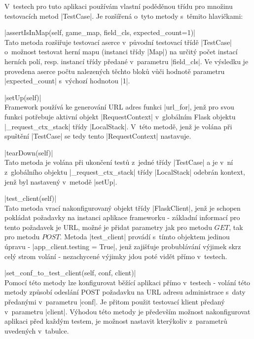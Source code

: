 V~testech pro tuto aplikaci používám vlastní poděděnou třídu pro množinu testovacích metod \ic|TestCase|. Je rozšířená o~tyto metody s~těmito hlavičkami:
\begin{description}
	\item \ic|assertIsInMap(self, game_map, field_cls, expected_count=1)| \\
	Tato metoda rozšiřuje testovací aserce v~původní testovací třídě \ic|TestCase| o~možnost testovat herní mapu (instanci třídy \ic|Map|) na určitý počet instací herních polí, resp. instancí třídy předané v~parametru \ic|field_cls|. Ve výsledku je provedena aserce počtu nalezených těchto bloků vůči hodnotě parametru \ic|expected_count| s~výchozí hodnotou \ic|1|.

    \item \ic|setUp(self)| \\
    Framework  používá ke generování URL adres funkci \ic|url_for|, jenž pro svou funkci potřebuje aktivní objekt \ic|RequestContext| v~globálním Flask objektu \ic|_request_ctx_stack| třídy \ic|LocalStack|. V~této metodě, jenž je volána při spuštění \ic|TestCase| se tedy tento \ic|RequestContext| nastavuje. 

    \item \ic|tearDown(self)| \\
    Tato metoda je volána při ukončení testů z~jedné třídy \ic|TestCase| a je v~ní z~globálního objektu \ic|_request_ctx_stack| třídy \ic|LocalStack| odebrán kontext, jenž byl nastavený v~metodě \ic|setUp|.

    \item \ic|test_client(self)| \\
    Tato metoda vrací nakonfigurovaný objekt třídy \ic|FlaskClient|, jenž je schopen pokládat požadavky na instanci aplikace frameworku  - základní informací pro tento požadavek je URL, možné je přidat parametry jak pro  metodu $GET$, tak pro metodu $POST$. Metoda \ic|test_client| provádí s~tímto objektem jedinou úpravu - \ic|app_client.testing = True|, jenž zajišťuje probublávání výjimek skrz celý strom volání - nezachycené výjimky jdou poté vidět přímo v~testech.

    \item \ic|set_conf_to_test_client(self, conf, client)| \\
    Pomocí této metody lze konfigurovat běžící aplikaci přímo v~testech - volání této metody způsobí odeslání POST požadavku na URL adresu administrace s~daty předanými v~parametru \ic|conf|. Je přitom použit testovací klient předaný v~parametru \ic|client|. Výhodou této metody je především možnost nakonfigurovat aplikaci před každým testem, je možnost nastavit kterýkoliv z~parametrů uvedených v~tabulce. 
\end{description}

